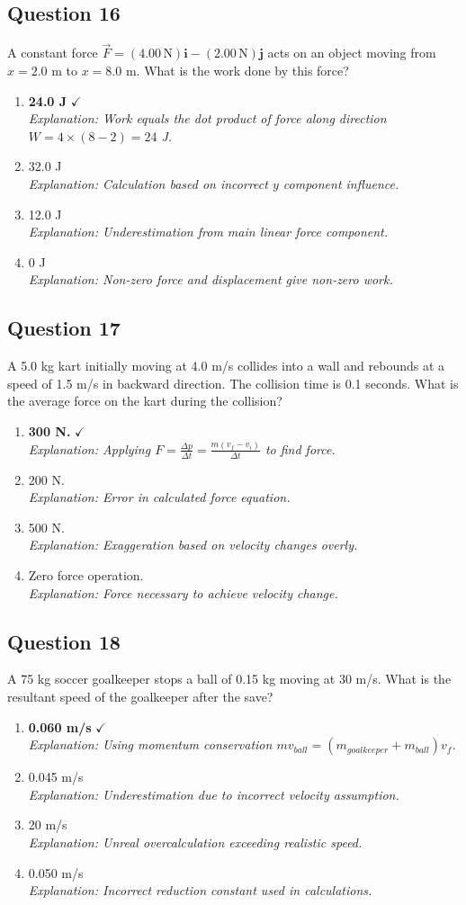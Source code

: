 \documentclass[11pt]{article}
\newcommand{\QBlock}[3]{%
  \subsection*{Question #1}
  #2
  \begin{enumerate}[label=(\Alph*)]
  #3
  \end{enumerate}
  \vspace{1em}
}
\newcommand{\Correct}[2]{%
  \item \textbf{#1} \hfill $\checkmark$ \\
  \textit{Explanation: #2}
}
\newcommand{\Wrong}[2]{%
  \item #1 \\
  \textit{Explanation: #2}
}
\begin{document}
\QBlock{16}{A constant force $\vec{F} = (4.00\, \text{N})\mathbf{i} - (2.00\, \text{N})\mathbf{j}$ acts on an object moving from $x = 2.0$ m to $x = 8.0$ m. What is the work done by this force?}{
  \Correct{24.0 J}{Work equals the dot product of force along direction $W = 4 \times (8 - 2) = 24$ J.}
  \Wrong{32.0 J}{Calculation based on incorrect $y$ component influence.}
  \Wrong{12.0 J}{Underestimation from main linear force component.}
  \Wrong{0 J}{Non-zero force and displacement give non-zero work.}
}

\QBlock{17}{A 5.0 kg kart initially moving at 4.0 m/s collides into a wall and rebounds at a speed of 1.5 m/s in backward direction. The collision time is 0.1 seconds. What is the average force on the kart during the collision?}{
  \Correct{300 N.}{Applying $F = \frac{\Delta p}{\Delta t} = \frac{m(v_f - v_i)}{\Delta t}$ to find force.}
  \Wrong{200 N.}{Error in calculated force equation.}
  \Wrong{500 N.}{Exaggeration based on velocity changes overly.}
  \Wrong{Zero force operation.}{Force necessary to achieve velocity change.}
}

\QBlock{18}{A 75 kg soccer goalkeeper stops a ball of 0.15 kg moving at 30 m/s. What is the resultant speed of the goalkeeper after the save?}{
  \Correct{0.060 m/s}{Using momentum conservation $mv_{ball} = (m_{goalkeeper} + m_{ball})v_f$.}
  \Wrong{0.045 m/s}{Underestimation due to incorrect velocity assumption.}
  \Wrong{20 m/s}{Unreal overcalculation exceeding realistic speed.}
  \Wrong{0.050 m/s}{Incorrect reduction constant used in calculations.}
}
\end{document}

